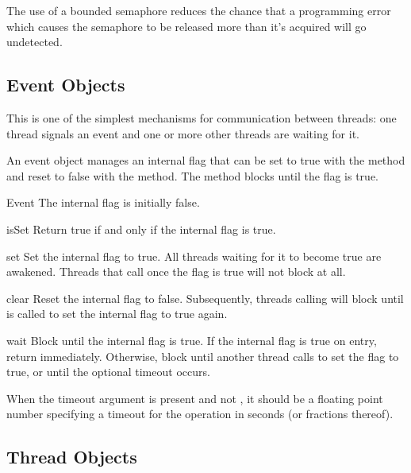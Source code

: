 The use of a bounded semaphore reduces the chance that a programming error
which causes the semaphore to be released more than it's acquired will go
undetected.

\subsection{Event Objects \label{event-objects}}

This is one of the simplest mechanisms for communication between
threads: one thread signals an event and one or more other threads
are waiting for it.

An event object manages an internal flag that can be set to true with
the  method and reset to false with the  method.  The
 method blocks until the flag is true.


\begin{classdesc}{Event}{}
The internal flag is initially false.
\end{classdesc}

\begin{methoddesc}{isSet}{}
Return true if and only if the internal flag is true.
\end{methoddesc}

\begin{methoddesc}{set}{}
Set the internal flag to true.
All threads waiting for it to become true are awakened.
Threads that call  once the flag is true will not block
at all.
\end{methoddesc}

\begin{methoddesc}{clear}{}
Reset the internal flag to false.
Subsequently, threads calling  will block until  is
called to set the internal flag to true again.
\end{methoddesc}

\begin{methoddesc}{wait}{}
Block until the internal flag is true.
If the internal flag is true on entry, return immediately.  Otherwise,
block until another thread calls  to set the flag to
true, or until the optional timeout occurs.

When the timeout argument is present and not , it should be a
floating point number specifying a timeout for the operation in
seconds (or fractions thereof).
\end{methoddesc}


\subsection{Thread Objects \label{thread-objects}}

